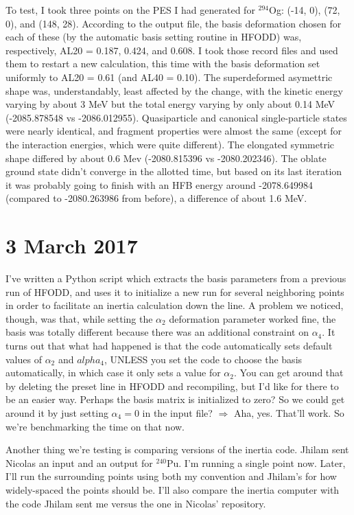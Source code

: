\documentclass[]{report}
\begin{document}
To test, I took three points on the PES I had generated for $^{294}$Og: (-14, 0), (72, 0), and (148, 28). According to the output file, the basis deformation chosen for each of these (by the automatic basis setting routine in HFODD) was, respectively, AL20 = 0.187, 0.424, and 0.608. I took those record files and used them to restart a new calculation, this time with the basis deformation set uniformly to AL20 = 0.61 (and AL40 = 0.10). The superdeformed asymettric shape was, understandably, least affected by the change, with the kinetic energy varying by about 3 MeV but the total energy varying by only about 0.14 MeV (-2085.878548 vs -2086.012955). Quasiparticle and canonical single-particle states were nearly identical, and fragment properties were almost the same (except for the interaction energies, which were quite different). The elongated symmetric shape differed by about 0.6 Mev (-2080.815396 vs -2080.202346). The oblate ground state didn't converge in the allotted time, but based on its last iteration it was probably going to finish with an HFB energy around -2078.649984 (compared to -2080.263986 from before), a difference of about 1.6 MeV.

\section*{3 March 2017}
I've written a Python script which extracts the basis parameters from a previous run of HFODD, and uses it to initialize a new run for several neighboring points in order to facilitate an inertia calculation down the line. A problem we noticed, though, was that, while setting the $\alpha_2$ deformation parameter worked fine, the basis was totally different because there was an additional constraint on $\alpha_4$. It turns out that what had happened is that the code automatically sets default values of $\alpha_2$ and $alpha_4$, UNLESS you set the code to choose the basis automatically, in which case it only sets a value for $\alpha_2$. You can get around that by deleting the preset line in HFODD and recompiling, but I'd like for there to be an easier way. Perhaps the basis matrix is initialized to zero? So we could get around it by just setting $\alpha_4=0$ in the input file? $\Rightarrow$ Aha, yes. That'll work. So we're benchmarking the time on that now.

Another thing we're testing is comparing versions of the inertia code. Jhilam sent Nicolas an input and an output for $^{240}$Pu. I'm running a single point now. Later, I'll run the surrounding points using both my convention and Jhilam's for how widely-spaced the points should be. I'll also compare the inertia computer with the code Jhilam sent me versus the one in Nicolas' repository.
\end{document}
